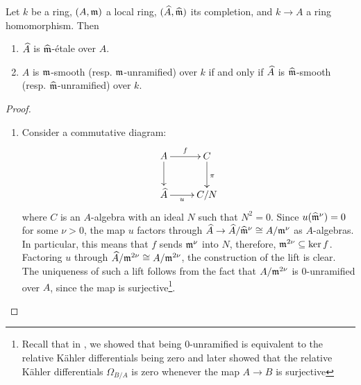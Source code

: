 \begin{proposition}
    Let $k$ be a ring, $(A,\mathfrak{m})$ a local ring, $(\widehat{A},\widehat{\mathfrak{m}})$ its completion, and $k\to A$ a ring homomorphism. Then 
    \begin{enumerate}[label=(\arabic*)]
        \item $\widehat{A}$ is $\widehat{\mathfrak{m}}$-\'etale over $A$. 
        \item $A$ is $\mathfrak{m}$-smooth (resp. $\mathfrak{m}$-unramified) over $k$ if and only if $\widehat{A}$ is $\widehat{\mathfrak{m}}$-smooth (resp. $\widehat{\mathfrak{m}}$-unramified) over $k$.
    \end{enumerate}
\end{proposition}
\begin{proof}
\begin{enumerate}[label=(\arabic*)]
    \item Consider a commutative diagram: 
    \begin{equation*}
        \xymatrix {
            A\ar[r]^-f\ar[d] & C\ar[d]^\pi\\
            \wh A\ar[r]_-u & C/N
        }
    \end{equation*}
    where $C$ is an $A$-algebra with an ideal $N$ such that $N^2 = 0$. Since $u(\widehat{\mathfrak{m}}^\nu) = 0$ for some $\nu > 0$, the map $u$ factors through $\widehat{A}\to \widehat{A}/\widehat{\mathfrak{m}}^\nu\cong A/\mathfrak{m}^\nu$ as $A$-algebras. In particular, this means that $f$ sends $\mathfrak{m}^\nu$ into $N$, therefore, $\mathfrak{m}^{2\nu}\subseteq\ker f$. Factoring $u$ through $\widehat{A}/\mathfrak{m}^{2\nu}\cong A/\mathfrak{m}^{2\nu}$, the construction of the lift is clear. The uniqueness of such a lift follows from the fact that $A/\mathfrak{m}^{2\nu}$ is $0$-unramified over $A$, since the map is surjective\footnote{Recall that in , we showed that being $0$-unramified is equivalent to the relative K\"ahler differentials being zero and later showed that the relative K\"ahler differentials $\Omega_{B/A}$ is zero whenever the map $A\to B$ is surjective}.


\end{enumerate}
\end{proof}
